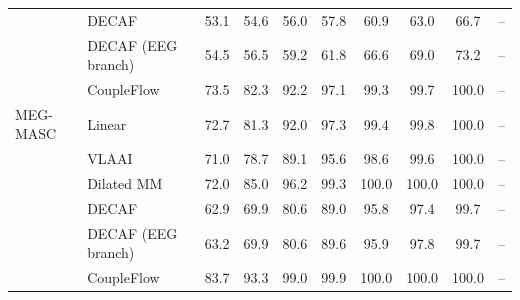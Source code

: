 \begin{tabular}{llcccccccc}
 & DECAF & 53.1 & 54.6 & 56.0 & 57.8 & 60.9 & 63.0 & 66.7 & -- \\
 & DECAF (EEG branch) & 54.5 & 56.5 & 59.2 & 61.8 & 66.6 & 69.0 & 73.2 & -- \\
 & CoupleFlow & 73.5 & 82.3 & 92.2 & 97.1 & 99.3 & 99.7 & 100.0 & -- \\
\midrule
MEG-MASC & Linear & 72.7 & 81.3 & 92.0 & 97.3 & 99.4 & 99.8 & 100.0 & -- \\
 & VLAAI & 71.0 & 78.7 & 89.1 & 95.6 & 98.6 & 99.6 & 100.0 & -- \\
 & Dilated MM & 72.0 & 85.0 & 96.2 & 99.3 & 100.0 & 100.0 & 100.0 & -- \\
 & DECAF & 62.9 & 69.9 & 80.6 & 89.0 & 95.8 & 97.4 & 99.7 & -- \\
 & DECAF (EEG branch) & 63.2 & 69.9 & 80.6 & 89.6 & 95.9 & 97.8 & 99.7 & -- \\
 & CoupleFlow & 83.7 & 93.3 & 99.0 & 99.9 & 100.0 & 100.0 & 100.0 & -- \\
\bottomrule\end{tabular}
